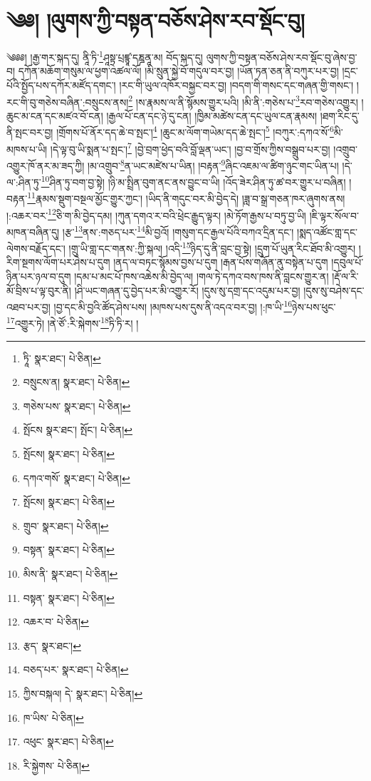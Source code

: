 \setcounter{footnote}{0} 
\chapter{༄༅། །ལུགས་ཀྱི་བསྟན་བཅོས་ཤེས་རབ་སྡོང་བུ།}༄༅༅། །རྒྱ་གར་སྐད་དུ། ནཱི་ཏི་\footnote{ཏཱི་  སྣར་ཐང་།  པེ་ཅིན། }ཤཱསྟྲ་པྲཛྙཱ་དཎྜནཱ་མ། བོད་སྐད་དུ། ལུགས་ཀྱི་བསྟན་བཅོས་ཤེས་རབ་སྡོང་བུ་ཞེས་བྱ་བ། དཀོན་མཆོག་གསུམ་ལ་ཕྱག་འཚལ་ལོ། །མི་སྲུན་སྐྱེ་བོ་གདུལ་བར་བྱ། །ཡོན་ཏན་ཅན་ནི་བཀུར་པར་བྱ། །དྲང་པོའི་སྤྱོད་པས་དཀོར་མཛོད་དགང་། །རང་གི་ཡུལ་འཁོར་བསྐྱང་བར་བྱ། །བདག་གི་གསང་དང་གཞན་གྱི་གསང་། །རང་གི་བུ་གཅེས་བཞིན་:བསྲུངས་ནས།\footnote{བསྲུངས་ན།  སྣར་ཐང་།  པེ་ཅིན། } །ས་རྣམས་ལ་ནི་སྙོམས་གྱུར་པའི། །མི་ནི་:གཅེས་པ་\footnote{གཅེས་པས་  སྣར་ཐང་།  པེ་ཅིན། }རབ་གཅེས་འགྱུར། །ཆུང་མ་ངན་དང་མཛའ་བོ་ངན། །རྒྱལ་པོ་ངན་དང་ཉེ་དུ་ངན། །ཁྱིམ་མཚེས་ངན་དང་ཡུལ་ངན་རྣམས། །ཐག་རིང་དུ་ནི་སྤང་བར་བྱ། །གྲོགས་པོ་ནོར་དད་ཆེ་བ་སྤང་།\footnote{སྤོངས  སྣར་ཐང་། སྤོང་།  པེ་ཅིན། } །ཆུང་མ་ལོག་གཡེམ་དད་ཆེ་སྤང་།\footnote{སྤོངས།  སྣར་ཐང་།  པེ་ཅིན། } །བཀུར་:དཀའ་སོ་\footnote{དཀའ་གསོ་  སྣར་ཐང་།  པེ་ཅིན། }མི་མཁས་པ་ཡི། །དེ་ལྟ་བུ་ཡི་སྨན་པ་སྤང་།\footnote{སྤོངས།  སྣར་ཐང་།  པེ་ཅིན། } །བྱེ་བྲག་ཕྱེད་བའི་བློ་ལྡན་ཡང་། །བྱ་བ་གྲོས་ཀྱིས་བསྒྲུབ་པར་བྱ། །འགྲུབ་འགྱུར་ཁོ་ནར་མ་ཟད་ཀྱི། །མ་འགྲུབ་\footnote{གྲུབ་  སྣར་ཐང་།  པེ་ཅིན། }ན་ཡང་མཛེས་པ་ཡིན། །བརྟན་\footnote{བསྟན་  སྣར་ཐང་།  པེ་ཅིན། }ཞིང་འཇམ་ལ་ཚིག་ཉུང་གང་ཡིན་པ། །དེ་ལ་:ཤིན་ཏུ་\footnote{མིས་ནི་  སྣར་ཐང་།  པེ་ཅིན། }ཤིན་ཏུ་བག་བྱ་སྟེ། །ཉི་མ་སྤྲིན་བུག་ནང་ནས་བྱུང་བ་ཡི། །འོད་ཟེར་ཤིན་ཏུ་ཚ་བར་གྱུར་པ་བཞིན། །བརྟན་\footnote{བསྟན་  སྣར་ཐང་།  པེ་ཅིན། }རྣམས་སྡུག་བསྔལ་མྱོང་གྱུར་ཀྱང་། །ཡིད་ནི་གདུང་བར་མི་བྱེད་དེ། །ཟླ་བ་སྒྲ་གཅན་ཁར་ཞུགས་ནས། །:འཆར་བར་\footnote{འཆར་བ་  པེ་ཅིན། }ཅི་ག་མི་བྱེད་དམ། །ཀུན་དགའ་ར་བའི་ཕྲེང་རྒྱུད་ལྟར། །མེ་ཏོག་རྒྱས་པ་བཏུ་བྱ་ཡི། །ཇི་ལྟར་སོལ་བ་མཁན་བཞིན་དུ། །རྩ་\footnote{རྩད་  སྣར་ཐང་། }ནས་:གཅད་པར་\footnote{བཅད་པར་  སྣར་ཐང་།  པེ་ཅིན། }མི་བྱའོ། །གསུག་དང་རྒྱལ་པོའི་བཀའ་དྲིན་དང་། །སྨད་འཚོང་གླ་དང་ལེགས་བརྗོད་དང་། །གྲུ་ཡི་གླ་དང་གནས་:ཀྱི་སྐལ། །འདི་\footnote{ཀྱིས་བསྐལ། དེ་  སྣར་ཐང་།  པེ་ཅིན། }ཉིད་དུ་ནི་བླང་བྱ་སྟེ། །དྲུག་པོ་ཡུན་རིང་ཐོབ་མི་འགྱུར། །རིག་སྔགས་ལོག་པར་ཤེས་པ་དུག །ནད་ལ་བཏང་སྙོམས་བྱས་པ་དུག །རྒན་པོས་གཞོན་ནུ་བསྟེན་པ་དུག །དབུལ་པོ་ཉིན་པར་ཉལ་བ་དུག །དམ་པ་མང་པོ་ཁས་འཆེས་མི་བྱེད་ལ། །གལ་ཏེ་དཀའ་བས་ཁས་ནི་བླངས་གྱུར་ན། །རྡོ་ལ་རི་མོ་བྲིས་པ་ལྟ་བུར་ནི། །ཤི་ཡང་གཞན་དུ་བྱེད་པར་མི་འགྱུར་རོ། །དུས་སུ་དགྲ་དང་འདུམ་པར་བྱ། །དུས་སུ་བཤེས་དང་འཐབ་པར་བྱ། །བྱ་དང་མི་བྱའི་ཚོད་ཤེས་པས། །མཁས་པས་དུས་ནི་འདའ་བར་བྱ། །:ཁ་ཡི་\footnote{ཁ་ཡིས་  པེ་ཅིན། }ཉེས་པས་ཕུང་\footnote{འཕུང་  སྣར་ཐང་།  པེ་ཅིན། }འགྱུར་ཏེ། །ནེ་ཙོ་:རི་སྐེགས་\footnote{རི་སྐྱེགས་  པེ་ཅིན། }ཏི་ཏི་ར། །
